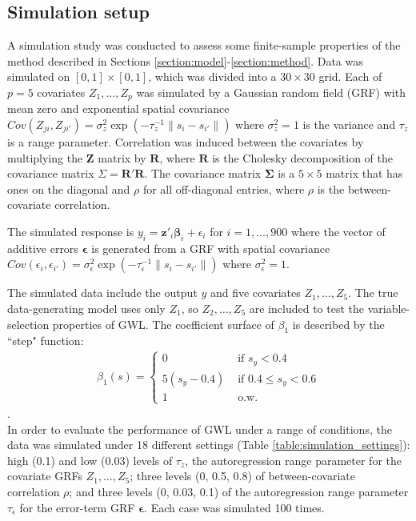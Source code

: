 \documentclass[authoryear, review, 11pt]{elsarticle}
\begin{document}
	\subsection{Simulation setup}
	A simulation study was conducted to assess some finite-sample properties of the method described in Sections \ref{section:model}-\ref{section:method}. Data was simulated on $[0,1] \times [0,1]$, which was divided into a $30 \times 30$ grid. Each of $p=5$ covariates $Z_1, \dots, Z_p$ was simulated by a Gaussian random field (GRF) with mean zero and exponential spatial covariance $Cov \left(Z_{ji}, Z_{ji'} \right) = \sigma_z^2 \exp{\left( -\tau_z^{-1} \|s_i - s_{i'} \| \right)}$ where $\sigma_z^2=1$ is the variance and $\tau_z$ is a range parameter. Correlation was induced between the covariates by multiplying the $\bm{Z}$ matrix by $\bm{R}$, where $\bm{R}$ is the Cholesky decomposition of the covariance matrix $\Sigma = \bm{R}'\bm{R}$. The covariance matrix $\bm{\Sigma}$ is a $5 \times 5$ matrix that has ones on the diagonal and $\rho$ for all off-diagonal entries, where $\rho$ is the between-covariate correlation.
		
	The simulated response is $y_i = \bm{z}'_i \bm{\beta}_i + \epsilon_i$ for $i=1, \dots, 900$ where the vector of additive errors $\bm{\epsilon}$ is generated from a GRF with spatial covariance $Cov \left(\epsilon_{i}, \epsilon_{i'} \right) = \sigma_{\epsilon}^2 \exp{\left( -\tau_{\epsilon}^{-1} \|s_i - s_{i'} \| \right)}$ where $\sigma_{\epsilon}^2=1$.
	
	The simulated data include the output $y$ and five covariates $Z_1, \dots, Z_5$. The true data-generating model uses only $Z_1$, so $Z_2, \dots, Z_5$ are included to test the variable-selection properties of GWL. The coefficient surface of $\beta_1$ is described by the ``step" function:
	\begin{eqnarray}
		\beta_1(s) = \begin{cases} 0 &\mbox{ if } s_y<0.4 \\ 5(s_y-0.4) &\mbox{ if } 0.4 \leq s_y<0.6 \\ 1 &\mbox{ o.w.} \end{cases}
	\end{eqnarray}.\\
		
	In order to evaluate the performance of GWL under a range of conditions, the data was simulated under 18 different settings (Table \ref{table:simulation_settings}): high (0.1) and low (0.03) levels of $\tau_z$, the autoregression range parameter for the covariate GRFs $Z_1, \dots, Z_5$; three levels (0, 0.5, 0.8) of between-covariate correlation $\rho$; and three levels (0, 0.03, 0.1) of the autoregression range parameter $\tau_{\epsilon}$ for the error-term GRF $\bm{\epsilon}$. Each case was simulated 100 times.
	
\end{document}
